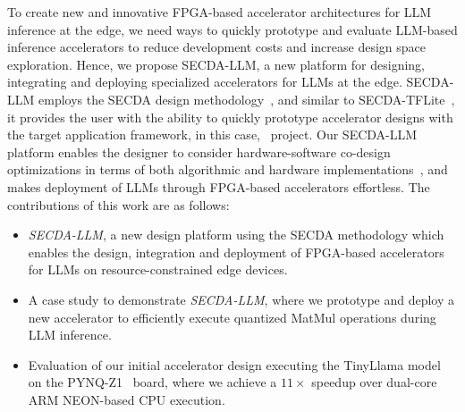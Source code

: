 To create new and innovative FPGA-based accelerator architectures for LLM inference at the edge, we need ways to quickly prototype and evaluate LLM-based inference accelerators to reduce development costs and increase design space exploration.
Hence, we propose SECDA-LLM, a new platform for designing, integrating and deploying specialized accelerators for LLMs at the edge.
SECDA-LLM employs the SECDA design methodology~\cite{harisSECDAEfficientHardware2021}, and similar to SECDA-TFLite~\cite{harisSECDATFLiteToolkitEfficient2023a}, it provides the user with the ability to quickly prototype accelerator designs with the target application framework, in this case, \LPP~project.
Our SECDA-LLM platform enables the designer to consider hardware-software co-design optimizations in terms of both algorithmic and hardware implementations~\cite{gibson_dlas_2024}, and makes deployment of LLMs through FPGA-based accelerators effortless.
The contributions of this work are as follows:

\begin{itemize}
    \item \textit{SECDA-LLM}, a new design platform using the SECDA methodology which enables the design, integration and deployment of FPGA-based accelerators for LLMs on resource-constrained edge devices.

    \item A case study to demonstrate \textit{SECDA-LLM}, where we prototype and deploy a new accelerator to efficiently execute quantized MatMul operations during LLM inference.

    \item Evaluation of our initial accelerator design executing the TinyLlama model~\cite{zhangTinyLlamaOpenSourceSmall2024} on the PYNQ-Z1~\cite{pynqz1} board, where we achieve a $11\times$ speedup over dual-core ARM NEON-based CPU execution.
    
        
\end{itemize}




